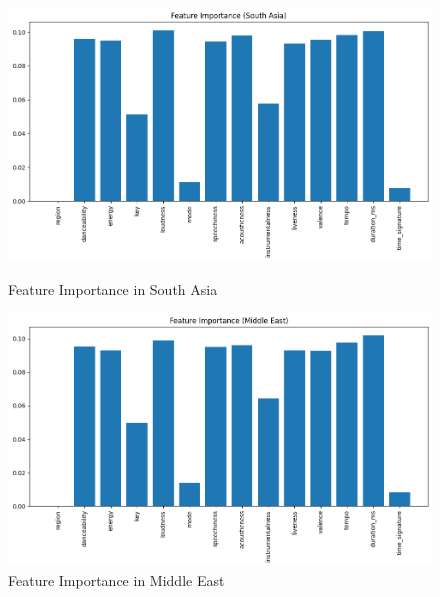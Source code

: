 \begin{figure}[h]
    \centering
    \begin{minipage}{0.45\textwidth}
        \centering
        \includegraphics[width=\linewidth]{media/rf_feature_imp_south_asia.png}
        \caption{Feature Importance in South Asia}
    \end{minipage}%
    \hspace{0.05\textwidth} %
    \begin{minipage}{0.45\textwidth}
        \centering
        \includegraphics[width=\linewidth]{media/rf_feature_imp_middle_east.png}
        \caption{Feature Importance in Middle East}
    \end{minipage}
\end{figure}

